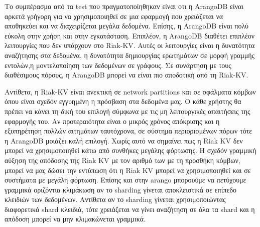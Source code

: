 \documentclass[conference]{IEEEtran}
\begin{document}


Το συμπέρασμα από τα test που πραγματοποίηθηκαν είναι οτι η ArangoDB είναι
αρκετά γρήγορη για να χρησιμοποιηθεί σε μια εφαρμογή που χρειάζεται να αποθηκεύει
και να διαχειρίζεται μεγάλα δεδομένα. Επίσης, η ArangoDB είναι πολύ εύκολη στην
χρήση και στην εγκατάσταση. Επιπλέον, η ArangoDB διαθέτει επιπλέον λειτουργίες
που δεν υπάρχουν στο Riak-KV.
Αυτές οι λειτουργίες είναι η δυνατότητα
αναζήτησης στα δεδομένα, η δυνατότητα δημιουργίας ερωτημάτων σε μορφή
γραμμής εντολών,η μοντελοποίηση των δεδομένων σε γράφους. 
Σε συνάρτηση με τους διαθέσιμους πόρους, η ArangoDB μπορεί να
είναι πιο αποδοτική από τη  Riak-KV. 

Αντίθετα, η Riak-KV είναι ανεκτική σε 
network partitions και σε σφάλματα κόμβων όπου είναι σχεδόν εγγυημένη η πρόσβαση
στα δεδομένα μας. Ο κάθε χρήστης θα πρέπει να κάνει τη δική του επιλογή 
σύμφωνα με τις μη λειτουργικές απαιτήσεις της εφαρμογής του. Αν προτεραιότητα είναι ο μικρός 
χρόνος απόκρισης και η εξυπηρέτηση πολλών αιτημάτων ταυτόχρονα, σε σύστημα περιορισμένων πόρων
τότε η ArangoDB μοιάζει καλή επιλογή. Χωρίς αυτό να σημαίνει πως η Riak KV δεν μπορεί να χρησιμοποιηθεί
κάτω από συνθήκες μεγάλης φόρτωσης. Η σχεδόν γραμμική αύξηση της απόδοσης της Riak KV με τον αριθμό των
με τη προσθήκη κόμβων, μπορεί να μας δώσει την εντύπωση ότι η Riak KV μπορεί να χρησιμοποιηθεί και σε
συστήματα με μεγάλη φόρτωση. 
Επίσης και στην arango μπορουύμε να πετύχουμε γραμμικά οριζόντια κλιμάκωση αν το 
sharding γίνεται αποκλειστικά σε επίπεδο κλειδιών των δεδομένων. Αντίθετα αν το sharding γίνεται χρησιμοποιώντας 
διαφορετικά shard κλειδιά, τότε χρειάζεται να γίνει αναζήτηση σε όλα τα shard και η απόδοση 
μπορεί να μην κλιμακώνεται γραμμικά.
\end{document}
